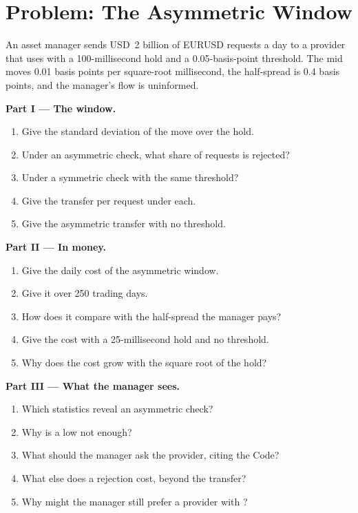 \section{Problem: The Asymmetric Window}

\begin{problem}\label{pb:m2:fx-spot-microstructure:1}
An asset manager sends USD~2 billion of EURUSD requests a day to a provider
that uses  with a 100-millisecond hold and a 0.05-basis-point
threshold. The mid moves 0.01 basis points per square-root millisecond, the
half-spread is 0.4 basis points, and the manager's flow is uninformed.

\medskip\noindent\textbf{Part I --- The window.}
\begin{enumerate}
\item Give the standard deviation of the move over the hold.
\item Under an asymmetric check, what share of requests is rejected?
\item Under a symmetric check with the same threshold?
\item Give the transfer per request under each.
\item Give the asymmetric transfer with no threshold.
\end{enumerate}

\medskip\noindent\textbf{Part II --- In money.}
\begin{enumerate}[resume]
\item Give the daily cost of the asymmetric window.
\item Give it over 250 trading days.
\item How does it compare with the half-spread the manager pays?
\item Give the cost with a 25-millisecond hold and no threshold.
\item Why does the cost grow with the square root of the hold?
\end{enumerate}

\medskip\noindent\textbf{Part III --- What the manager sees.}
\begin{enumerate}[resume]
\item Which statistics reveal an asymmetric check?
\item Why is a low  not enough?
\item What should the manager ask the provider, citing the Code?
\item What else does a rejection cost, beyond the transfer?
\item Why might the manager still prefer a provider with ?
\end{enumerate}


\end{problem}
